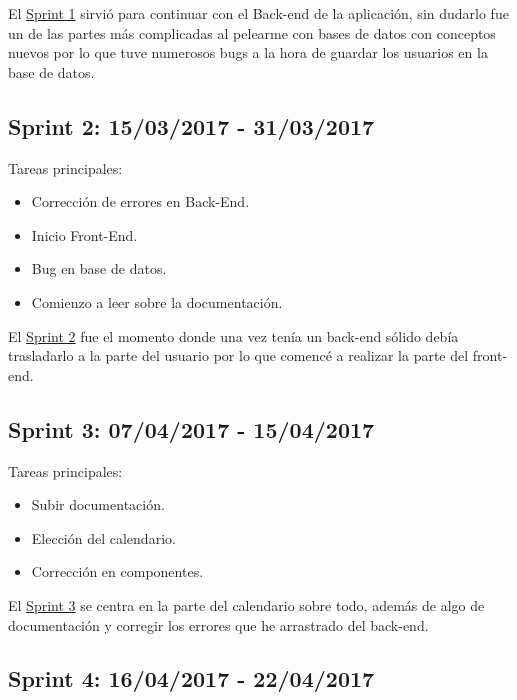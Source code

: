 El  \underline{Sprint 1} sirvió para continuar con el Back-end de la aplicación, sin dudarlo fue un de las partes más complicadas al pelearme con bases de datos con conceptos nuevos por lo que tuve numerosos bugs a la hora de guardar los usuarios en la base de datos.

\subsection{Sprint 2: 15/03/2017 - 31/03/2017}\label{sprint2}

Tareas principales:

\begin{itemize}
	\item Corrección de errores en Back-End.
	\item Inicio Front-End.
	\item Bug en base de datos.
	\item Comienzo a leer sobre la documentación.
\end{itemize}


El \underline{Sprint 2} fue el momento donde una vez tenía un back-end sólido debía trasladarlo a la parte del usuario por lo que comencé a realizar la parte del front-end.

\subsection{Sprint 3: 07/04/2017 - 15/04/2017}\label{sprint3}

Tareas principales:

\begin{itemize}
	\item Subir documentación.
	\item Elección del calendario.
	\item Corrección en componentes.
\end{itemize}


El \underline{Sprint 3} se centra en la parte del calendario sobre todo, además de algo de documentación y corregir los errores que he arrastrado del back-end.

\subsection{Sprint 4: 16/04/2017 - 22/04/2017}\label{sprint4}

